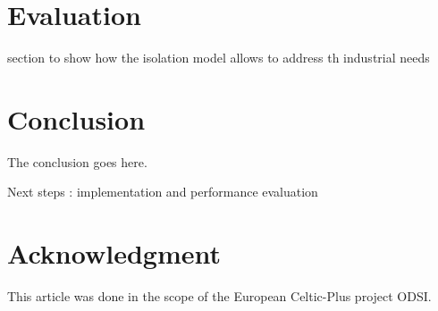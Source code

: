 \documentclass[conference]{IEEEtran}
\begin{document}
\section{Evaluation}
section to show how the isolation model allows to address th industrial needs


\section{Conclusion}
The conclusion goes here.

Next steps : implementation and performance evaluation






\section*{Acknowledgment}
This article was done in the scope of the European Celtic-Plus project ODSI.  







%
%
%

%
%
\end{document}
